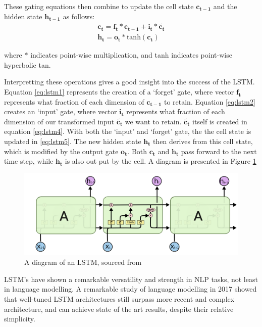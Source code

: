 These gating equations then combine to update the cell state $\mathbf{c_{t-1}}$ and the hidden state $\mathbf{h_{t-1}}$ as follows: 
\begin{align}
    \mathbf{c_t} = \mathbf{f_t} * \mathbf{c_{t-1}} + \mathbf{i_t} * \mathbf{\tilde{c_t}} \label{eq:lstm5}\\
    \mathbf{h_t} = \mathbf{o_t} * \text{tanh}(\mathbf{c_t}) \label{eq:lstm6}
\end{align}

where  $*$ indicates point-wise multiplication, and tanh indicates point-wise hyperbolic tan.

Interpretting these operations gives a good insight into the success of the LSTM.  
Equation \ref{eq:lstm1} represents the creation of a `forget' gate, where vector $\mathbf{f_t}$ represents what fraction of each dimension of $\mathbf{c_{t-1}}$ to retain. 
Equation \ref{eq:lstm2}  creates an `input' gate, where vector $\mathbf{i_t}$ represents what fraction of each dimension of our transformed input $\mathbf{\tilde{c_{t}}}$ we want to retain.  
$\mathbf{\tilde{c_{t}}}$ itself is created in equation \ref{eq:lstm4}. With both the `input' and `forget' gate, the  the cell state is updated in \ref{eq:lstm5}. 
The new hidden state $\mathbf{h_{t}}$ then derives from this cell state, which is modified by the output gate $\mathbf{o_t}$. 
Both $\mathbf{c_{t}}$ and $\mathbf{h_{t}}$ pass forward to the next time step, while $\mathbf{h_{t}}$ is also out put by the cell. 
A diagram is presented in Figure \ref{fig:lstm_colah}

\begin{figure}[tb]
    \centering
    \includegraphics[width=\linewidth]{ModelPics/LSTMcolah.png}
    \caption{A diagram of an LSTM, sourced from \cite{noauthor_understanding_nodate}}
    \label{fig:lstm_colah}{}
\end{figure}

LSTM's have shown a remarkable versatility and strength in NLP tasks, not least in language modelling. A remarkable study of language modelling in 2017 showed that well-tuned LSTM architectures still surpass more recent and complex architecture, and can achieve state of the art results, despite their relative simplicity\cite{melis_state_2017}.

